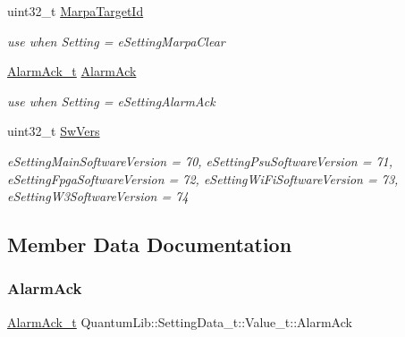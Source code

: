 \begin{DoxyCompactItemize}
uint32\+\_\+t \mbox{\hyperlink{union_quantum_lib_1_1_setting_data__t_1_1_value__t_a8dd6227cf9bfa8a59d918bc6f786fcaf}{Marpa\+Target\+Id}}
\begin{DoxyCompactList}\small\item\em use when \textquotesingle{}Setting\textquotesingle{} = e\+Setting\+Marpa\+Clear \end{DoxyCompactList}\item 
\mbox{\hyperlink{struct_quantum_lib_1_1_alarm_ack__t}{Alarm\+Ack\+\_\+t}} \mbox{\hyperlink{union_quantum_lib_1_1_setting_data__t_1_1_value__t_a3a2626bdce27a3bc5d1981801876839a}{Alarm\+Ack}}
\begin{DoxyCompactList}\small\item\em use when \textquotesingle{}Setting\textquotesingle{} = e\+Setting\+Alarm\+Ack \end{DoxyCompactList}\item 
uint32\+\_\+t \mbox{\hyperlink{union_quantum_lib_1_1_setting_data__t_1_1_value__t_a161eb3020945d99ef882b69481488247}{Sw\+Vers}}
\begin{DoxyCompactList}\small\item\em e\+Setting\+Main\+Software\+Version = 70, e\+Setting\+Psu\+Software\+Version = 71, e\+Setting\+Fpga\+Software\+Version = 72, e\+Setting\+Wi\+Fi\+Software\+Version = 73, e\+Setting\+W3\+Software\+Version = 74 \end{DoxyCompactList}\end{DoxyCompactItemize}


\subsection{Member Data Documentation}
\mbox{\label{union_quantum_lib_1_1_setting_data__t_1_1_value__t_a3a2626bdce27a3bc5d1981801876839a}} 
\subsubsection{\texorpdfstring{Alarm\+Ack}{AlarmAck}}
{\footnotesize\ttfamily \mbox{\hyperlink{struct_quantum_lib_1_1_alarm_ack__t}{Alarm\+Ack\+\_\+t}} Quantum\+Lib\+::\+Setting\+Data\+\_\+t\+::\+Value\+\_\+t\+::\+Alarm\+Ack}




